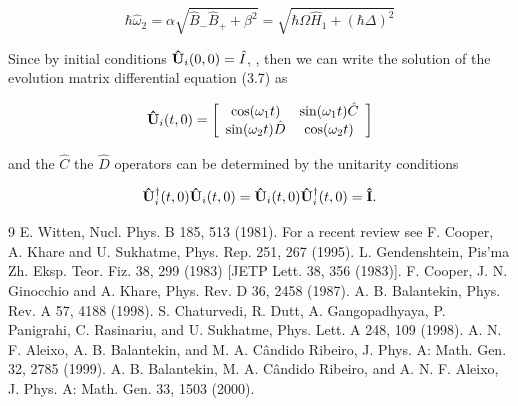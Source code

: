 \documentclass[a4paper, 10pt]{article}
\numberwithin{equation}{section}
\begin{document}
\begin{equation}
    \hbar\hat{\omega}_2 = \alpha \sqrt{\hat{B}_-\hat{B}_+ +\beta^2} = \sqrt{\hbar\Omega \hat{H}_1 + (\hbar\Delta)^2}
\end{equation}

\noindent
Since by initial conditions ${\bf \hat{U}}_i(0,0) = \hat{I}$, , then we can write the solution of the evolution matrix differential equation (3.7) as

\begin{equation}
    {\bf \hat{U}}_i(t,0) = \left [\begin{array}{cc}
      \cos(\omega_1 t)   & \sin(\omega_1 t)\hat{C} \\
        \sin(\omega_2 t)\hat{D} & \cos(\omega_2 t)
    \end{array} \right]
\end{equation}

\noindent
and the $\hat{C}$ the $\hat{D}$ operators can be determined by the unitarity conditions

\begin{equation}
    {\bf \hat{U}}_i^{\dagger}(t,0){\bf \hat{U}}_i(t,0) = {\bf \hat{U}}_i(t,0){\bf \hat{U}}_i^ {\dagger}(t,0) = {\bf \hat{I}} .
\end{equation}

\begin{thebibliography}{9}
\bibitem{[1]} E. Witten, Nucl. Phys. B 185, 513 (1981).
\bibitem{[2]} For a recent review see F. Cooper, A. Khare and U. Sukhatme, Phys. Rep. 251, 267
(1995).
\bibitem{[3]} L. Gendenshtein, Pis’ma Zh. Eksp. Teor. Fiz. 38, 299 (1983) [JETP Lett. 38, 356
(1983)].
\bibitem{[4]} F. Cooper, J. N. Ginocchio and A. Khare, Phys. Rev. D 36, 2458 (1987).
\bibitem{[5]} A. B. Balantekin, Phys. Rev. A 57, 4188 (1998).
\bibitem{[6]} S. Chaturvedi, R. Dutt, A. Gangopadhyaya, P. Panigrahi, C. Rasinariu, and U.
Sukhatme, Phys. Lett. A 248, 109 (1998).
\bibitem{[7]} A. N. F. Aleixo, A. B. Balantekin, and M. A. Cândido Ribeiro, J. Phys. A: Math. Gen.
32, 2785 (1999).
\bibitem{[8]} A. B. Balantekin, M. A. Cândido Ribeiro, and A. N. F. Aleixo, J. Phys. A: Math. Gen.
33, 1503 (2000).
\end{thebibliography}
\end{document}
